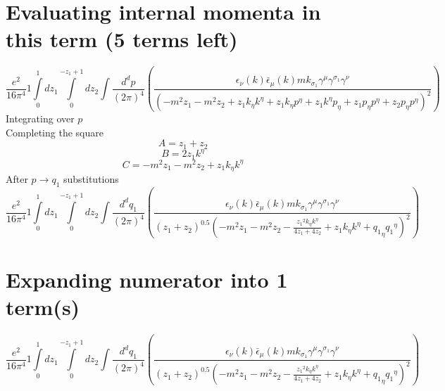 \section*{Evaluating internal momenta in this term (5 terms left)}
\begin{dmath}\frac{e^{2}}{16 \pi^{4}}1\int\limits_{ 0 }^{ 1 } d{ z_{ 1 } }\int\limits_{ 0 }^{ - { z_{ 1 } } + 1 } d{ z_{ 2 } }\int\frac{d^d p }{ (2\pi)^4 }\left(\frac{\epsilon_{ \nu }({ k }) \bar{\epsilon}_{ \mu }({ k }) m { { k }_{ \sigma_1 } } { \gamma^{ \mu } } { \gamma^{ \sigma_1 } } { \gamma^{ \nu } }}{\left(- m^{2} { z_{ 1 } } - m^{2} { z_{ 2 } } + { z_{ 1 } } { { k }_{ \eta } } { { k }^{ \eta } } + { z_{ 1 } } { { k }_{ \eta } } { { p }^{ \eta } } + { z_{ 1 } } { { k }^{ \eta } } { { p }_{ \eta } } + { z_{ 1 } } { { p }_{ \eta } } { { p }^{ \eta } } + { z_{ 2 } } { { p }_{ \eta } } { { p }^{ \eta } }\right)^{2}}\right)\end{dmath}
Integrating over $p$\\
Completing the square\
\begin{dmath}A = { z_{ 1 } } + { z_{ 2 } }\end{dmath}
\begin{dmath}B = 2 { z_{ 1 } } { { k }^{ \eta } }\end{dmath}
\begin{dmath}C = - m^{2} { z_{ 1 } } - m^{2} { z_{ 2 } } + { z_{ 1 } } { { k }_{ \eta } } { { k }^{ \eta } }\end{dmath}
After $p \to q_1$ substitutions
\begin{dmath}\frac{e^{2}}{16 \pi^{4}}1\int\limits_{ 0 }^{ 1 } d{ z_{ 1 } }\int\limits_{ 0 }^{ - { z_{ 1 } } + 1 } d{ z_{ 2 } }\int\frac{d^d q_1 }{ (2\pi)^4 }\left(\frac{\epsilon_{ \nu }({ k }) \bar{\epsilon}_{ \mu }({ k }) m { { k }_{ \sigma_1 } } { \gamma^{ \mu } } { \gamma^{ \sigma_1 } } { \gamma^{ \nu } }}{\left({ z_{ 1 } } + { z_{ 2 } }\right)^{0.5} \left(- m^{2} { z_{ 1 } } - m^{2} { z_{ 2 } } - \frac{{ z_{ 1 } }^{2} { { k }_{ \eta } } { { k }^{ \eta } }}{4 { z_{ 1 } } + 4 { z_{ 2 } }} + { z_{ 1 } } { { k }_{ \eta } } { { k }^{ \eta } } + { { q_1 }_{ \eta } } { { q_1 }^{ \eta } }\right)^{2}}\right)\end{dmath}
\section*{Expanding numerator into 1 term(s)}
\begin{dmath}\frac{e^{2}}{16 \pi^{4}}1\int\limits_{ 0 }^{ 1 } d{ z_{ 1 } }\int\limits_{ 0 }^{ - { z_{ 1 } } + 1 } d{ z_{ 2 } }\int\frac{d^d q_1 }{ (2\pi)^4 }\left(\frac{\epsilon_{ \nu }({ k }) \bar{\epsilon}_{ \mu }({ k }) m { { k }_{ \sigma_1 } } { \gamma^{ \mu } } { \gamma^{ \sigma_1 } } { \gamma^{ \nu } }}{\left({ z_{ 1 } } + { z_{ 2 } }\right)^{0.5} \left(- m^{2} { z_{ 1 } } - m^{2} { z_{ 2 } } - \frac{{ z_{ 1 } }^{2} { { k }_{ \eta } } { { k }^{ \eta } }}{4 { z_{ 1 } } + 4 { z_{ 2 } }} + { z_{ 1 } } { { k }_{ \eta } } { { k }^{ \eta } } + { { q_1 }_{ \eta } } { { q_1 }^{ \eta } }\right)^{2}}\right)\end{dmath}
